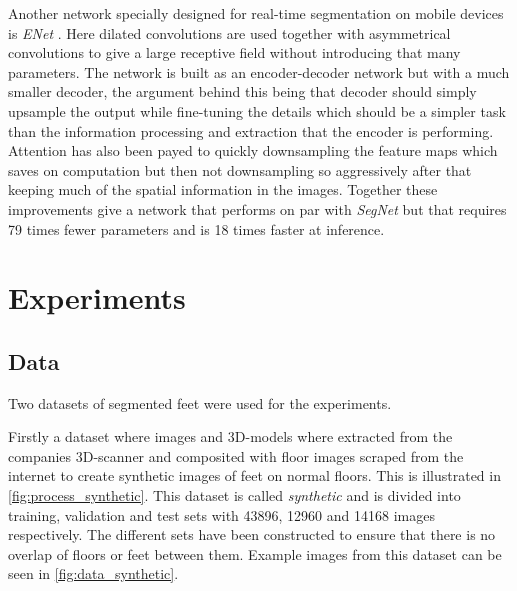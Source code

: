 \documentclass{kththesis}
\newcommand{\bibentry}[1]{\parencite{#1}}
\begin{document}
Another network specially designed for real-time segmentation on mobile devices
is \emph{ENet} \bibentry{paszke2016enet}. Here dilated convolutions are used
together with asymmetrical convolutions to give a large receptive field without
introducing that many parameters. The network is built as an encoder-decoder
network but with a much smaller decoder, the argument behind this being that
decoder should simply upsample the output while fine-tuning the details which
should be a simpler task than the information processing and extraction that the
encoder is performing. Attention has also been payed to quickly downsampling the
feature maps which saves on computation but then not downsampling so
aggressively after that keeping much of the spatial information in the images.
Together these improvements give a network that performs on par with
\emph{SegNet} but that requires 79 times fewer parameters and is 18 times faster
at inference. 


\chapter{Experiments}
\section{Data}
Two datasets of segmented feet were used for the experiments.

Firstly a dataset where images and 3D-models where extracted from the companies
3D-scanner and composited with floor images scraped from the internet to create
synthetic images of feet on normal floors. This is illustrated in \cref{fig:process_synthetic}.
This dataset is called
\textit{synthetic} and is divided into training, validation and test sets with
43896, 12960 and 14168 images respectively. The different sets have been
constructed to ensure that there is no overlap of floors or feet between them.
Example images from this dataset can be seen in \cref{fig:data_synthetic}.
\end{document}
